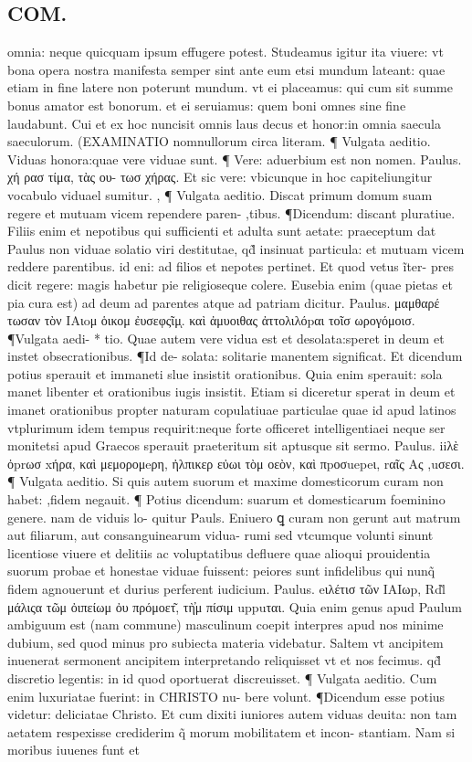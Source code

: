 \documentclass{article}
\begin{document}
\begin{pages}
\section*{COM. }
\marginpar{[ p.5 ]}\pstart omnia: neque quicquam ipsum effugere potest. Studeamus igitur ita viuere: vt bona opera nostra manifesta semper sint ante eum etsi mundum lateant: quae etiam in fine latere non poterunt mundum. vt ei placeamus: qui cum sit summe bonus amator est bonorum. et ei seruiamus: quem boni omnes sine fine laudabunt. Cui et ex hoc nuncisit omnis laus  decus et honor:in omnia saecula saeculorum.  \pend\pstart  (EXAMINATIO nomnullorum circa literam. ¶ Vulgata aeditio. Viduas honora:quae vere viduae sunt. ¶ Vere: aduerbium est non nomen. Paulus. χή ρασ τίμα, τὰς ου- τωσ χήρας. Et sic vere: vbicunque in hoc capiteliungitur vocabulo viduael sumitur. , ¶ Vulgata aeditio. Discat primum domum suam regere et mutuam vicem rependere paren- ,tibus. ¶Dicendum: discant pluratiue. Filiis enim et nepotibus qui sufficienti et adulta sunt aetate: praeceptum dat Paulus non viduae solatio viri destitutae, qd̃ insinuat particula: et mutuam vicem reddere parentibus. id eni: ad filios et nepotes pertinet. Et quod vetus ĩter- pres dicit regere: magis habetur pie religioseque colere. Eusebia enim (quae pietas et pia cura est) ad deum ad parentes atque ad patriam dicitur. Paulus. μαμθαρέ τωσαν τὸν IAιoμ ὁικομ ἐυσεφςῖμͅ. καὶ ἀμυοιθας ἀττολιλόpαι τοῖσ ωρογόμοισ. ¶Vulgata aedi- * tio. Quae autem vere vidua est et desolata:speret in deum et instet obsecrationibus. ¶Id de- solata: solitarie manentem significat. Et dicendum potius sperauit et immaneti slue insistit orationibus. Quia enim sperauit: sola manet libenter et orationibus iugis insistit. Etiam si diceretur sperat in deum et imanet orationibus propter naturam copulatiuae particulae quae id apud latinos vtplurimum idem tempus requirit:neque forte officeret intelligentiaei neque ser monitetsi apud Graecos sperauit praeteritum sit aptusque sit sermo. Paulus. iiλὲ ὀprωσ xήρα, καὶ μεμορομeρη, ἠλπικερ εὐωι τὸμ οεὸν, καὶ πpοσuepeι, rαῖς Aς ,uσεσι. ¶ Vulgata aeditio. Si quis autem suorum et maxime domesticorum curam non habet: ,fidem negauit. ¶ Potius dicendum: suarum et domesticarum foeminino genere. nam de viduis lo- quitur Pauls. Eniuero ꝗ curam non gerunt aut matrum aut filiarum, aut consanguinearum vidua- rumi sed vtcumque volunti sinunt licentiose viuere et delitiis ac voluptatibus defluere quae alioqui prouidentia suorum probae et honestae viduae fuissent: peiores sunt infidelibus qui nunq̃ fidem agnouerunt et durius perferent iudicium. Paulus. eιλέτισ τῶν IAIωp, Rdl̀ μάλιςα τῶμ ὀιπείωμ ὀυ πρόμοετ͂, τὴ̓μ πίσιμ uppuται. Quia enim genus apud Paulum ambiguum est (nam commune) masculinum coepit interpres apud nos minime dubium, sed quod minus pro subiecta materia videbatur. Saltem vt ancipitem inuenerat sermonent ancipitem interpretando reliquisset vt et nos fecimus. qd̃ discretio legentis: in id quod oportuerat discreuisset. ¶ Vulgata aeditio. Cum enim luxuriatae fuerint: in CHRISTO nu- bere volunt. ¶Dicendum esse potius videtur: deliciatae Christo. Et cum dixiti iuniores autem viduas deuita: non tam aetatem respexisse crediderim q̃ morum mobilitatem et incon- stantiam. Nam si moribus iuuenes funt et 
\end{pages}
\end{document}
